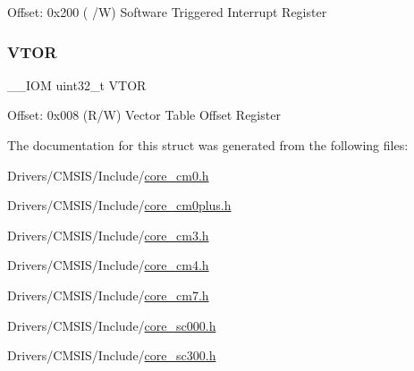 Offset\+: 0x200 ( /W) Software Triggered Interrupt Register \mbox{\label{struct_s_c_b___type_ae457d2615e203c3d5904a43a1bc9df71}} 
\subsubsection{\texorpdfstring{V\+T\+OR}{VTOR}}
{\footnotesize\ttfamily \+\_\+\+\_\+\+I\+OM uint32\+\_\+t V\+T\+OR}

Offset\+: 0x008 (R/W) Vector Table Offset Register 

The documentation for this struct was generated from the following files\+:\begin{DoxyCompactItemize}
\item 
Drivers/\+C\+M\+S\+I\+S/\+Include/\mbox{\hyperlink{core__cm0_8h}{core\+\_\+cm0.\+h}}\item 
Drivers/\+C\+M\+S\+I\+S/\+Include/\mbox{\hyperlink{core__cm0plus_8h}{core\+\_\+cm0plus.\+h}}\item 
Drivers/\+C\+M\+S\+I\+S/\+Include/\mbox{\hyperlink{core__cm3_8h}{core\+\_\+cm3.\+h}}\item 
Drivers/\+C\+M\+S\+I\+S/\+Include/\mbox{\hyperlink{core__cm4_8h}{core\+\_\+cm4.\+h}}\item 
Drivers/\+C\+M\+S\+I\+S/\+Include/\mbox{\hyperlink{core__cm7_8h}{core\+\_\+cm7.\+h}}\item 
Drivers/\+C\+M\+S\+I\+S/\+Include/\mbox{\hyperlink{core__sc000_8h}{core\+\_\+sc000.\+h}}\item 
Drivers/\+C\+M\+S\+I\+S/\+Include/\mbox{\hyperlink{core__sc300_8h}{core\+\_\+sc300.\+h}}\end{DoxyCompactItemize}
